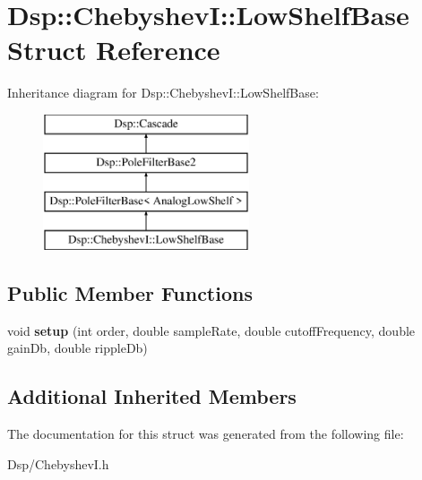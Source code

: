 \hypertarget{structDsp_1_1ChebyshevI_1_1LowShelfBase}{\section{Dsp\-:\-:Chebyshev\-I\-:\-:Low\-Shelf\-Base Struct Reference}
\label{structDsp_1_1ChebyshevI_1_1LowShelfBase}
}
Inheritance diagram for Dsp\-:\-:Chebyshev\-I\-:\-:Low\-Shelf\-Base\-:\begin{figure}[H]
\begin{center}
\leavevmode
\includegraphics[height=4.000000cm]{structDsp_1_1ChebyshevI_1_1LowShelfBase}
\end{center}
\end{figure}
\subsection*{Public Member Functions}
\begin{DoxyCompactItemize}
\item 
\hypertarget{structDsp_1_1ChebyshevI_1_1LowShelfBase_abaf642f5ad2dd72479ac79eafc961793}{void {\bfseries setup} (int order, double sample\-Rate, double cutoff\-Frequency, double gain\-Db, double ripple\-Db)}\label{structDsp_1_1ChebyshevI_1_1LowShelfBase_abaf642f5ad2dd72479ac79eafc961793}

\end{DoxyCompactItemize}
\subsection*{Additional Inherited Members}


The documentation for this struct was generated from the following file\-:\begin{DoxyCompactItemize}
\item 
Dsp/Chebyshev\-I.\-h\end{DoxyCompactItemize}
